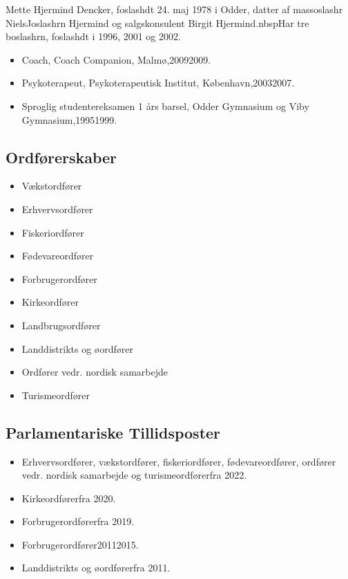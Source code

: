 \documentclass[11pt, a4paper]{awesome-cv}
\begin{document}
\makecvheader[R]
\makelettertitle
\begin{cvletter}
Mette Hjermind Dencker, foslashdt 24. maj 1978 i Odder, datter af massoslashr NielsJoslashrn Hjermind og salgskonsulent Birgit Hjermind.nbspHar tre boslashrn, foslashdt i 1996, 2001 og 2002.

\begin{itemize}
\item Coach, Coach Companion, Malmø,20092009.
\item Psykoterapeut, Psykoterapeutisk Institut, København,20032007.
\item Sproglig studentereksamen 1 års barsel, Odder Gymnasium og Viby Gymnasium,19951999.
\end{itemize}
\subsection*{Ordførerskaber}
\begin{itemize}
\item Vækstordfører
\item Erhvervsordfører
\item Fiskeriordfører
\item Fødevareordfører
\item Forbrugerordfører
\item Kirkeordfører
\item Landbrugsordfører
\item Landdistrikts og øordfører
\item Ordfører vedr. nordisk samarbejde
\item Turismeordfører
\end{itemize}
\subsection*{Parlamentariske Tillidsposter}
\begin{itemize}
\item Erhvervsordfører, vækstordfører, fiskeriordfører, fødevareordfører, ordfører vedr. nordisk samarbejde og turismeordførerfra 2022.
\item Kirkeordførerfra 2020.
\item Forbrugerordførerfra 2019.
\item Forbrugerordfører20112015.
\item Landdistrikts og øordførerfra 2011.
\end{itemize}

\end{cvletter}
\end{document}
